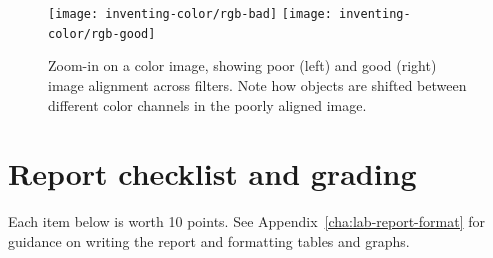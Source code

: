 \begin{figure}
\texttt{[image: inventing-color/rgb-bad]}
\texttt{[image: inventing-color/rgb-good]}
\caption{Zoom-in on a color image, showing poor (left) and good (right)
image alignment across filters. Note how objects are shifted between different
color channels in the poorly aligned image.}\label{ic:fig:rgb-bad} 
\end{figure}

\section{Report checklist and grading}

Each item below is worth 10 points. See Appendix\ \ref{cha:lab-report-format}
for guidance on writing the report and formatting tables and graphs.

